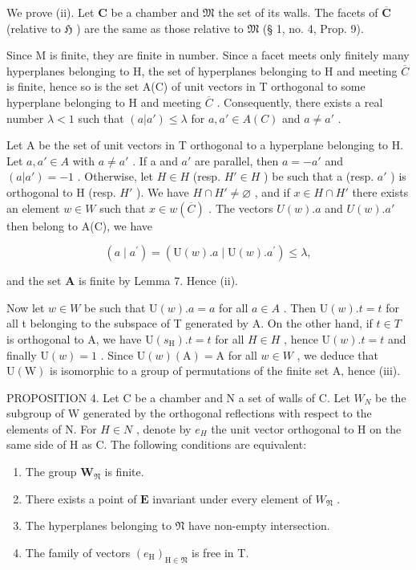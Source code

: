 We prove (ii). Let \(\mathbf{C}\) be a chamber and \(\mathfrak{M}\) the set of its walls. The facets of \(\overline{\mathbf{C}}\) (relative to \(\mathfrak{H}\) ) are the same as those relative to \(\mathfrak{M}\) (§ 1, no. 4, Prop. 9).

Since M is finite, they are finite in number. Since a facet meets only finitely many hyperplanes belonging to H, the set of hyperplanes belonging to H and meeting \(\overline{C}\) is finite, hence so is the set A(C) of unit vectors in T orthogonal to some hyperplane belonging to H and meeting \(\overline{C}\) . Consequently, there exists a real number \(\lambda < 1\) such that \((a|a') \leqslant \lambda\) for \(a, a' \in A(C)\) and \(a \neq a'\) .

Let A be the set of unit vectors in T orthogonal to a hyperplane belonging to H. Let \(a, a' \in A\) with \(a \neq a'\) . If a and \(a'\) are parallel, then \(a = -a'\) and \((a|a') = -1\) . Otherwise, let \(H \in H\) (resp. \(H' \in H\) ) be such that a (resp. \(a'\) ) is orthogonal to H (resp. \(H'\) ). We have \(H \cap H' \neq \varnothing\) , and if \(x \in H \cap H'\) there exists an element \(w \in W\) such that \(x \in w(\overline{C})\) . The vectors \(U(w).a\) and \(U(w).a'\) then belong to A(C), we have

\[
(a \mid a ^ {\prime}) = (\mathrm{U} (w). a \mid \mathrm{U} (w). a ^ {\prime}) \leqslant \lambda ,
\]

and the set \(\mathbf{A}\) is finite by Lemma 7. Hence (ii).

Now let \(w \in W\) be such that \(\mathrm{U}(w).a = a\) for all \(a \in A\) . Then \(\mathrm{U}(w).t = t\) for all t belonging to the subspace of T generated by A. On the other hand, if \(t \in T\) is orthogonal to A, we have \(\mathrm{U}(s_{\mathrm{H}}).t = t\) for all \(H \in H\) , hence \(\mathrm{U}(w).t = t\) and finally \(\mathrm{U}(w) = 1\) . Since \(\mathrm{U}(w)(\mathrm{A}) = \mathrm{A}\) for all \(w \in W\) , we deduce that \(\mathrm{U}(\mathrm{W})\) is isomorphic to a group of permutations of the finite set A, hence (iii).

PROPOSITION 4. Let C be a chamber and N a set of walls of C. Let \(W_{N}\) be the subgroup of W generated by the orthogonal reflections with respect to the elements of N. For \(H \in N\) , denote by \(e_{H}\) the unit vector orthogonal to H on the same side of H as C. The following conditions are equivalent:

\begin{enumerate}
\def\labelenumi{(\roman{enumi})}
\item
  The group \(\mathbf{W}_{\mathfrak{N}}\) is finite.
\item
  There exists a point of \(\mathbf{E}\) invariant under every element of \(W_{\mathfrak{N}}\) .
\item
  The hyperplanes belonging to \(\mathfrak{N}\) have non-empty intersection.
\item
  The family of vectors \((e_{\mathrm{H}})_{\mathrm{H}\in \mathfrak{N}}\) is free in T.
\end{enumerate}

